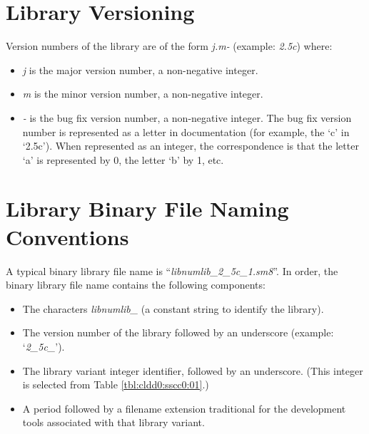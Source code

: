\section{Library Versioning}
\label{cldd0:slvn0}

Version numbers of the library are of the
form \emph{j.m-} (example: \emph{2.5c}) where:

\begin{itemize}
\item \emph{j} is the major version number, a non-negative
      integer.
\item \emph{m} is the minor version number, a non-negative
      integer.
\item \emph{-} is the bug fix version number, a non-negative
      integer.  The bug fix version number
      is represented as a letter in documentation (for
      example, the `c' in `2.5c').
      When represented as an integer, the correspondence
      is that the letter `a' is represented by 0,
      the letter `b' by 1, etc.
\end{itemize}


\section{Library Binary File Naming Conventions}
\label{cldd0:slpn0}

%
A typical binary library file name is 
``\emph{libnumlib\_2\_5c\_1.sm8}''.
In order, the binary library file name contains the
following components:

\begin{itemize}
\item The characters \emph{libnumlib\_} (a constant string
      to identify the library).
\item The version number of the library followed by an
      underscore
      (example: `\emph{2\_5c\_}').
\item The library variant integer identifier, followed by
      an underscore.  (This integer
      is selected from Table \ref{tbl:cldd0:sscc0:01}.)
\item A period followed by a filename extension traditional
      for the
      development tools associated with that library
      variant.
\end{itemize}


